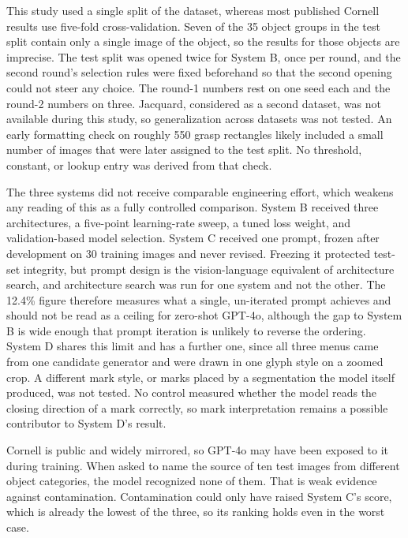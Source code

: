 \documentclass[12pt,letterpaper]{article}
\begin{document}
This study used a single split of the dataset, whereas most published
Cornell results use five-fold cross-validation. Seven of the 35 object
groups in the test split contain only a single image of the object, so
the results for those objects are imprecise. The test split was opened
twice for System B, once per round, and the second round's selection
rules were fixed beforehand so that the second opening could not steer
any choice. The round-1 numbers rest on one seed each and the round-2
numbers on three. Jacquard, considered as a second dataset, was not
available during this study, so generalization across datasets was not
tested. An early formatting check on roughly 550 grasp rectangles likely
included a small number of images that were later assigned to the test
split. No threshold, constant, or lookup entry was derived from that
check.

The three systems did not receive comparable engineering effort, which
weakens any reading of this as a fully controlled comparison. System B
received three architectures, a five-point learning-rate sweep, a tuned
loss weight, and validation-based model selection. System C received one
prompt, frozen after development on 30 training images and never
revised. Freezing it protected test-set integrity, but prompt design is
the vision-language equivalent of architecture search, and architecture
search was run for one system and not the other. The 12.4\% figure
therefore measures what a single, un-iterated prompt achieves and should
not be read as a ceiling for zero-shot GPT-4o, although the gap to
System B is wide enough that prompt iteration is unlikely to reverse the
ordering. System D shares this limit and has a further one, since all
three menus came from one candidate generator and were drawn in one
glyph style on a zoomed crop. A different mark style, or marks placed by
a segmentation the model itself produced, was not tested. No control
measured whether the model reads the closing direction of a mark
correctly, so mark interpretation remains a possible contributor to
System D's result.

Cornell is public and widely mirrored, so GPT-4o may have been exposed
to it during training. When asked to name the source of ten test images
from different object categories, the model recognized none of them.
That is weak evidence against contamination. Contamination could only
have raised System C's score, which is already the lowest of the three,
so its ranking holds even in the worst case.
\end{document}
